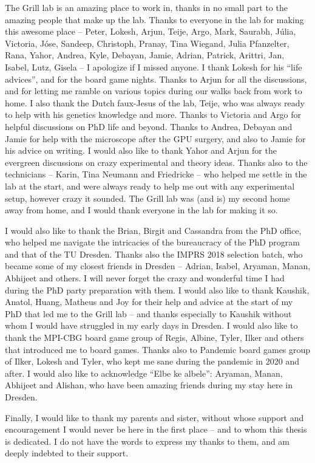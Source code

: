 The Grill lab is an amazing place to work in, thanks in no small part to the amazing people that make up the lab. Thanks to everyone in the lab for making this awesome place -- Peter, Lokesh, Arjun, Teije, Argo, Mark, Saurabh, J{\'u}lia, Victoria, J{\'o}se, Sandeep, Christoph, Pranay, Tina Wiegand, Julia Pfanzelter, Rana, Yahor, Andrea, Kyle, Debayan, Jamie, Adrian, Patrick, Arittri, Jan, Isabel, Lutz, Gisela -- I apologize if I missed anyone. I thank Lokesh for his \enquote{life advices}, and for the board game nights. Thanks to Arjun for all the discussions, and for letting me ramble on various topics during our walks back from work to home. I also thank the Dutch faux-Jesus of the lab, Teije, who was always ready to help with his genetics knowledge and more. Thanks to Victoria and Argo for helpful discussions on PhD life and beyond. Thanks to Andrea, Debayan and Jamie for help with the microscope after the GPU surgery, and also to Jamie for his advice on writing. I would also like to thank Yahor and Arjun for the evergreen discussions on crazy experimental and theory ideas. Thanks also to the technicians -- Karin, Tina Neumann and Friedricke -- who helped me settle in the lab at the start, and were always ready to help me out with any experimental setup, however crazy it sounded. The Grill lab was (and is) my second home away from home, and I would thank everyone in the lab for making it so. 

I would also like to thank the Brian, Birgit and Cassandra from the PhD office, who helped me navigate the intricacies of the bureaucracy of the PhD program and that of the TU Dresden. Thanks also the IMPRS 2018 selection batch, who became some of my closest friends in Dresden -- Adrian, Isabel, Aryaman, Manan, Abhijeet and others. I will never forget the crazy and wonderful time I had during the PhD party preparation with them. I would also like to thank Kaushik, Anatol, Huang, Matheus and Joy for their help and advice at the start of my PhD that led me to the Grill lab -- and thanks especially to Kaushik without whom I would have struggled in my early days in Dresden. I would also like to thank the MPI-CBG board game group of Regis, Albine, Tyler, Ilker and others that introduced me to board games. Thanks also to Pandemic board games group of Ilker, Lokesh and Tyler, who kept me sane during the pandemic in 2020 and after. I would also like to acknowledge \enquote{Elbe ke albele}: Aryaman, Manan, Abhijeet and Alishan, who have been amazing friends during my stay here in Dresden.

Finally, I would like to thank my parents and sister, without whose support and encouragement I would never be here in the first place -- and to whom this thesis is dedicated. I do not have the words to express my thanks to them, and am deeply indebted to their support.